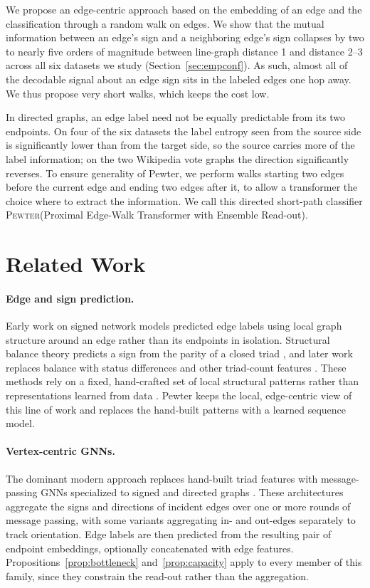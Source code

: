 \documentclass[sigconf, review, anonymous]{acmart}
\newcommand{\Pewter}{\textsc{Pewter}\xspace}
\begin{document}
We propose an edge-centric approach based on the embedding of an edge and the classification through a random walk on edges. We show that the mutual information between an edge's sign and a neighboring edge's sign collapses by two to nearly five orders of magnitude between line-graph distance 1 and distance 2--3 across all six datasets we study (Section~\ref{sec:empconf}). As such, almost all of the decodable signal about an edge sign sits in the labeled edges one hop away. We thus propose very short walks, which keeps the cost low.

In directed graphs, an edge label need not be equally predictable from its two endpoints. On four of the six datasets the label entropy seen from the source side is significantly lower than from the target side, so the source carries more of the label information; on the two Wikipedia vote graphs the direction significantly reverses. To ensure generality of Pewter, we perform walks starting two edges before the current edge and ending two edges after it, to allow a transformer the choice where to extract the information. We call this directed short-path classifier \Pewter (Proximal Edge-Walk Transformer with Ensemble Read-out).

\section{Related Work}
\paragraph{Edge and sign prediction.} Early work on signed network models predicted edge labels using local graph structure around an edge rather than its endpoints in isolation. Structural balance theory predicts a sign from the parity of a closed triad \cite{cartwright1956structural}, and later work replaces balance with status differences and other triad-count features \citep{leskovec2010predicting}. These methods rely on a fixed, hand-crafted set of local structural patterns rather than representations learned from data \citep{naaman2019edge}. Pewter keeps the local, edge-centric view of this line of work and replaces the hand-built patterns with a learned sequence model.

\paragraph{Vertex-centric GNNs.} The dominant modern approach replaces hand-built triad features with message-passing GNNs specialized to signed and directed graphs \citep{derr2018signed, huang2019signed}. These architectures aggregate the signs and directions of incident edges over one or more rounds of message passing, with some variants aggregating in- and out-edges separately to track orientation. Edge labels are then predicted from the resulting pair of endpoint embeddings, optionally concatenated with edge features. Propositions~\ref{prop:bottleneck} and~\ref{prop:capacity} apply to every member of this family, since they constrain the read-out rather than the aggregation.
\end{document}
